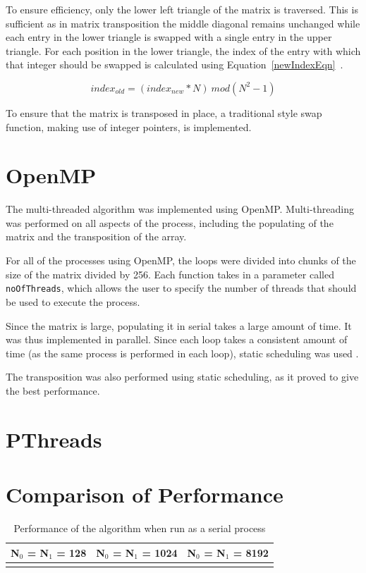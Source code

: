 \documentclass[10pt,twocolumn]{witseiepaper}
\begin{document}
To ensure efficiency, only the lower left triangle of the matrix is traversed. This is sufficient as in matrix transposition the middle diagonal remains unchanged while each entry in the lower triangle is swapped with a single entry in the upper triangle. For each position in the lower triangle, the index of the entry with which that integer should be swapped is calculated using Equation~\ref{newIndexEqn}~\cite{inPlaceTranspose}.

\begin{equation}
\label{newIndexEqn}
index_{old} = (index_{new}*N)~mod(N^2-1)
\end{equation}

To ensure that the matrix is transposed in place, a traditional style swap function, making use of integer pointers, is implemented.

\section{OpenMP}
The multi-threaded algorithm was implemented using OpenMP. Multi-threading was performed on all aspects of the process, including the populating of the matrix and the transposition of the array. 

For all of the processes using OpenMP, the loops were divided into chunks of the size of the matrix divided by 256. Each function takes in a parameter called \texttt{noOfThreads}, which allows the user to specify the number of threads that should be used to execute the process.

Since the matrix is large, populating it in serial takes a large amount of time. It was thus implemented in parallel. Since each loop takes a consistent amount of time (as the same process is performed in each loop), static scheduling was used \cite{HPC}. 

The transposition was also performed using static scheduling, as it proved to give the best performance. 

\section{PThreads}

\section{Comparison of Performance}

\begin{table}[h]
	\centering
	\caption{Performance of the algorithm when run as a serial process}
	\begin{tabular}{|c|c|c|}
	\hline
	  N$_{0}$ = N$_{1}$ = 128 &  N$_{0}$ = N$_{1}$ = 1024 & N$_{0}$ = N$_{1}$ = 8192 \\
		\hline 
		  &  &  \\ 
		\hline 
	\end{tabular} 
\end{table} 
\end{document}
